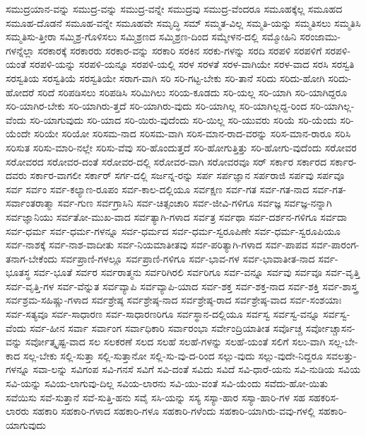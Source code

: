 {ಸಮುದ್ರಯಾನ-ವನ್ನು
ಸಮುದ್ರ-ವನ್ನು
ಸಮುದ್ರ-ವನ್ನೇ
ಸಮುದ್ರವು
ಸಮುದ್ರ-ವೆಂದರೂ
ಸಮೂಹಕ್ಕೆಲ್ಲ
ಸಮೂಹದ
ಸಮೂಹ-ದೊಡನೆ
ಸಮೂಹ-ವನ್ನೇ
ಸಮೂಹವೇ
ಸಮೃದ್ಧಿ
ಸಮ್
ಸಮ್ಮತ-ವಿಲ್ಲ
ಸಮ್ಮತಿ-ಯನ್ನು
ಸಮ್ಮತಿಸಲು
ಸಮ್ಮತಿಸಿ
ಸಮ್ಮತಿಸು-ತ್ತೀರಾ
ಸಮ್ಮಿಶ್ರ-ಗೊಳಿಸಲು
ಸಮ್ಮಿಶ್ರಣದ
ಸಮ್ಮಿಶ್ರಣ-ದಿಂದ
ಸಮ್ಮೇಳನ-ದಲ್ಲಿ
ಸಮ್ಮೋಹಿನಿ
ಸರಂಜಾಮು-ಗಳನ್ನೆಲ್ಲಾ
ಸರಕಾರಕ್ಕೆ
ಸರಕಾರರು
ಸರಕಾರ-ವನ್ನು
ಸರಕಾರಿ
ಸರಕಿನ
ಸರಕು-ಗಳನ್ನು
ಸರದಿ
ಸರಪಳಿ
ಸರಪಳಿಗೆ
ಸರಪಳಿ-ಯಂತೆ
ಸರಪಳಿ-ಯನ್ನು
ಸರಪಳಿ-ಯನ್ನೂ
ಸರಪಳಿ-ಯಲ್ಲಿ
ಸರಳ
ಸರಳತೆ
ಸರಳ-ವಾಗಿಯೇ
ಸರಳ-ವಾದ
ಸರಸಿ
ಸರಸ್ವತಿ
ಸರಸ್ವತಿಯ
ಸರಸ್ವತಿಯೆ
ಸರಸ್ವತಿಯೇ
ಸರಾಗ-ವಾಗಿ
ಸರಿ
ಸರಿ-ಗಟ್ಟ-ಬೇಕು
ಸರಿ-ತಾನೆ
ಸರಿದು
ಸರಿದು-ಹೋಗಿ
ಸರಿದು-ಹೋದರೆ
ಸರಿದೆ
ಸರಿಪಡಿಸಲು
ಸರಿಪಡಿಸಿ
ಸರಿಮಿಗಿಲು
ಸರಿಯ-ಕೂಡದು
ಸರಿ-ಯಲ್ಲ
ಸರಿ-ಯಾಗಿ
ಸರಿ-ಯಾಗಿದ್ದರೂ
ಸರಿ-ಯಾಗಿರ-ಬೇಕು
ಸರಿ-ಯಾಗಿರು-ತ್ತದೆ
ಸರಿ-ಯಾಗಿರು-ವುದು
ಸರಿ-ಯಾಗಿಲ್ಲ
ಸರಿ-ಯಾಗಿಲ್ಲದ್ದ-ರಿಂದ
ಸರಿ-ಯಾಗಿಲ್ಲ-ವೆಂದು
ಸರಿ-ಯಾಗುವುದು
ಸರಿ-ಯಾದ
ಸರಿ-ಯಿರು-ವುದೆಂದು
ಸರಿ-ಯಿಲ್ಲ
ಸರಿ-ಯುವರು
ಸರಿಯೆ
ಸರಿ-ಯೆಂದು
ಸರಿ-ಯೆಂದೇ
ಸರಿಯೇ
ಸರಿಯೋ
ಸರಿಸಮ-ನಾದ
ಸರಿಸಮ-ವಾಗಿ
ಸರಿಸ-ಮಾನ-ರಾದ-ವರನ್ನು
ಸರಿಸ-ಮಾನ-ರಾರೂ
ಸರಿಸಿ
ಸರಿಸುತ
ಸರಿಸು-ಮಾರಿ-ನಲ್ಲೇ
ಸರಿಸು-ವೆವು
ಸರಿ-ಹೊಂದುತ್ತದೆ
ಸರಿ-ಹೋಗುತ್ತಿತ್ತು
ಸರಿ-ಹೋಗು-ವುದೆಂದು
ಸರೋವರ
ಸರೋವರದ
ಸರೋವರ-ದಂತೆ
ಸರೋವರ-ದಲ್ಲಿ
ಸರೋವರ-ವಾಗಿ
ಸರೋವರವೂ
ಸರ್
ಸರ್ಕಾರ
ಸರ್ಕಾರದ
ಸರ್ಕಾರ-ದವರು
ಸರ್ಕಾರ-ವಾಗಲೀ
ಸರ್ಕಾರ್
ಸರ್ಗ-ದಲ್ಲಿ
ಸರ್ಜನ್ನ-ರನ್ನು
ಸರ್ಪ
ಸರ್ಪಜ್ಞಾನ
ಸರ್ಪರಾಜಿ
ಸರ್ಪವು
ಸರ್ಪವೂ
ಸರ್ವ
ಸರ್ವಂ
ಸರ್ವ-ಕಲ್ಯಾಣ-ರೂಪಂ
ಸರ್ವ-ಕಾಲ-ದಲ್ಲಿಯೂ
ಸರ್ವಕ್ಷಣ
ಸರ್ವ-ಗತ
ಸರ್ವ-ಗತ-ನಾದ
ಸರ್ವ-ಗತ-ಸರ್ವಾಂತರಾತ್ಮಾ
ಸರ್ವ-ಗುಣ
ಸರ್ವಗ್ರಾಸಿನಿ
ಸರ್ವ-ಚಿತ್ಸಂಚಾರಿ
ಸರ್ವ-ಜೀವಿ-ಗಳಿಗೂ
ಸರ್ವಜ್ಞ
ಸರ್ವಜ್ಞ-ನನ್ನಾಗಿ
ಸರ್ವಜ್ಞಾನಿಯು
ಸರ್ವತೋ-ಮುಖ-ವಾದ
ಸರ್ವತ್ಯಾಗಿ-ಗಳಾದ
ಸರ್ವತ್ರ
ಸರ್ವಥಾ
ಸರ್ವ-ದರ್ಶನ-ಗಳಿಗೂ
ಸರ್ವದಾ
ಸರ್ವ-ಧರ್ಮ
ಸರ್ವ-ಧರ್ಮ-ಗಳನ್ನೂ
ಸರ್ವ-ಧರ್ಮದ
ಸರ್ವ-ಧರ್ಮ-ಸ್ವರೂಪಿಣೇ
ಸರ್ವ-ಧರ್ಮ-ಸ್ವರೂಪಿಯೂ
ಸರ್ವ-ನಾಶಕ್ಕೆ
ಸರ್ವ-ನಾಶ-ವಾದೀತು
ಸರ್ವ-ನಿಯಮಾತೀತವು
ಸರ್ವ-ಪರಿತ್ಯಾಗಿ-ಗಳಾದ
ಸರ್ವ-ಪಾಪವ
ಸರ್ವ-ಪಾರಂಗ-ತನಾಗ-ಬೇಕೆಂದು
ಸರ್ವಪ್ರಾಣಿ-ಗಳಲ್ಲೂ
ಸರ್ವಪ್ರಾಣಿ-ಗಳಿಗೂ
ಸರ್ವ-ಭಾವ-ಗಳ
ಸರ್ವ-ಭಾವಾತೀತ-ನಾದ
ಸರ್ವ-ಭೂತಸ್ಥ
ಸರ್ವ-ಭೂತೆ
ಸರ್ವರ
ಸರ್ವರಾತ್ಮನು
ಸರ್ವರಿಗಿರಲಿ
ಸರ್ವರಿಗೂ
ಸರ್ವ-ವನ್ನೂ
ಸರ್ವವು
ಸರ್ವವೂ
ಸರ್ವ-ವೃತ್ತಿ
ಸರ್ವ-ವೃತ್ತಿ-ಗಳ
ಸರ್ವ-ವೆನ್ನುತ
ಸರ್ವವ್ಯಾಪಿ
ಸರ್ವವ್ಯಾಪಿ-ಯಾದ
ಸರ್ವ-ಶಕ್ತ
ಸರ್ವ-ಶಕ್ತ-ನಾದ
ಸರ್ವ-ಶಕ್ತಿ
ಸರ್ವ-ಶಾಸ್ತ್ರ
ಸರ್ವಶ್ರಮ-ಸಹಿಷ್ಣು-ಗಳಾದ
ಸರ್ವಶ್ರೇಷ್ಠ
ಸರ್ವಶ್ರೇಷ್ಠ-ನಾದ
ಸರ್ವಶ್ರೇಷ್ಠ-ರಾದ
ಸರ್ವಶ್ರೇಷ್ಠ-ವಾದ
ಸರ್ವ-ಸಂಶಯಾಃ
ಸರ್ವ-ಸತ್ಯವೂ
ಸರ್ವ-ಸಾಧಾರಣ
ಸರ್ವ-ಸಾಧಾರಣರಿಗೂ
ಸರ್ವಸ್ಥಾನ-ದಲ್ಲಿಯೂ
ಸರ್ವಸ್ವ
ಸರ್ವಸ್ವ-ವನ್ನೂ
ಸರ್ವಸ್ವ-ವೆಂದು
ಸರ್ವ-ಹೀನ
ಸರ್ವಾ
ಸರ್ವಾಂಗ
ಸರ್ವಾಧಿಕಾರಿ
ಸರ್ವಾರಂಭಾ
ಸರ್ವೇಂದ್ರಿಯಾತೀತ
ಸರ್ವೊಚ್ಚ
ಸರ್ವೋಚ್ಚಾಸನ-ವನ್ನು
ಸರ್ವೋತ್ಕೃಷ್ಟ-ವಾದ
ಸಲ
ಸಲಕರಣೆ
ಸಲದ
ಸಲಹೆ
ಸಲಹೆ-ಗಳನ್ನು
ಸಲಹೆ-ಯಂತೆ
ಸಲಿಗೆ
ಸಲು-ವಾಗಿ
ಸಲ್ಲ-ಬೇ-ಕಾದ
ಸಲ್ಲ-ಬೇಕು
ಸಲ್ಲಿ-ಸುತ್ತಾ
ಸಲ್ಲಿ-ಸುತ್ತಾನೋ
ಸಲ್ಲಿ-ಸು-ವು-ದ-ರಿಂದ
ಸಲ್ಲು-ವುದು
ಸಲ್ಲು-ವುದೇ-ನಿದ್ದರೂ
ಸವಲತ್ತು-ಗಳನ್ನೂ
ಸವಾ-ಲನ್ನು
ಸವಿಗಂಪ
ಸವಿ-ಗನಸೆ
ಸವಿಗೆ
ಸವಿ-ದಂತೆ
ಸವಿದು
ಸವಿದೆ
ಸವಿ-ಧಾರೆ-ಯನು
ಸವಿ-ನುಡಿಯ
ಸವಿಯ
ಸವಿ-ಯನ್ನು
ಸವಿಯ-ಲಾಗುವು-ದಿಲ್ಲ
ಸವಿಯ-ಲಾರನು
ಸವಿ-ಯು-ವಂತೆ
ಸವಿ-ಯೆಂದು
ಸವೆದು-ಹೋ-ಯಿತು
ಸವೆಯಿಸು
ಸವೆ-ಸುತ್ತಾನೆ
ಸವೆ-ಸುತ್ತಿ-ಹನು
ಸವೈ
ಸಸಿ-ಯನ್ನು
ಸಸ್ಯ
ಸಸ್ಯಾ-ಹಾರ
ಸಸ್ಯಾ-ಹಾರಿ-ಗಳ
ಸಹ
ಸಹಕರಿಸ-ಲಾರರು
ಸಹಕಾರಿ
ಸಹಕಾರಿ-ಗಳಾದ
ಸಹಕಾರಿ-ಗಳೂ
ಸಹಕಾರಿ-ಗಳೆಂದು
ಸಹಕಾರಿ-ಯಾಗಿರು-ವವು-ಗಳಲ್ಲಿ
ಸಹಕಾರಿ-ಯಾಗುವುದು
}
